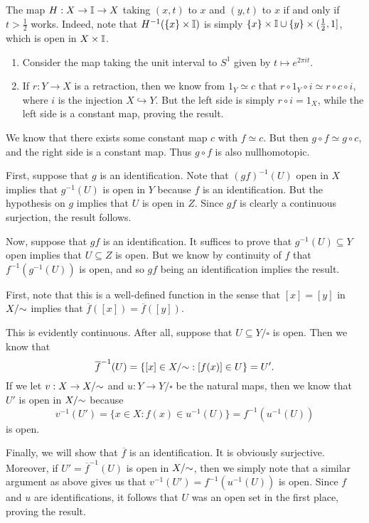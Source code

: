 \documentclass[../solutions.tex]{subfiles}
\begin{document}
\begin{exercise} \leavevmode
The map $H:X\to\mathbb I\to X$ taking $(x,t)$ to $x$ and $(y,t)$ to $x$ if and only if $t>\frac12$ works. Indeed, note that $H^{-1}(\{x\}\times\mathbb I)$ is simply $\{x\}\times\mathbb I\cup\{y\}\times(\frac12,1]$, which is open in $X\times\mathbb I$. 
\end{exercise} 

\begin{exercise} \leavevmode
\begin{enumerate}
\item Consider the map taking the unit interval to $S^1$ given by $t\mapsto e^{2\pi it}$. 

\item If $r:Y\to X$ is a retraction, then we know from $1_Y\simeq c$ that $r\circ1_Y\circ i\simeq r\circ c\circ i$, where $i$ is the injection $X\hookrightarrow Y$. But the left side is simply $r\circ i=1_X$, while the left side is a constant map, proving the result. 
\end{enumerate} 
\end{exercise} 

\begin{exercise} \leavevmode
We know that there exists some constant map $c$ with $f\simeq c$. But then $g\circ f\simeq g\circ c$, and the right side is a constant map. Thus $g\circ f$ is also nullhomotopic. 
\end{exercise} 

\begin{exercise} \leavevmode
First, suppose that $g$ is an identification. Note that $(gf)^{-1}(U)$ open in $X$ implies that $g^{-1}(U)$ is open in $Y$ because $f$ is an identification. But the hypothesis on $g$ implies that $U$ is open in $Z$. Since $gf$ is clearly a continuous surjection, the result follows. 

Now, suppose that $gf$ is an identification. It suffices to prove that $g^{-1}(U)\subseteq Y$ open implies that $U\subseteq Z$ is open. But we know by continuity of $f$ that $f^{-1}(g^{-1}(U))$ is open, and so $gf$ being an identification implies the result. 
\end{exercise} 

\begin{exercise} \leavevmode
First, note that this is a well-defined function in the sense that $[x]=[y]$ in $X/{\sim}$ implies that $\overline f([x])=\overline f([y])$. 

This is evidently continuous. After all, suppose that $U\subseteq Y/\square$ is open. Then we know that \[\overline f^{-1}(U)=\{[x]\in X/{\sim}:[f(x)]\in U\}=U'.\] If we let $v:X\to X/{\sim}$ and $u:Y\to Y/\square$ be the natural maps, then we know that $U'$ is open in $X/{\sim}$ because \[v^{-1}(U')=\{x\in X:f(x)\in u^{-1}(U)\}=f^{-1}(u^{-1}(U))\] is open. 

Finally, we will show that $\overline f$ is an identification. It is obviously surjective. Moreover, if $U'=\overline f^{-1}(U)$ is open in $X/{\sim}$, then we simply note that a similar argument as above gives us that $v^{-1}(U')=f^{-1}(u^{-1}(U))$ is open. Since $f$ and $u$ are identifications, it follows that $U$ was an open set in the first place, proving the result. 
\end{exercise} 
\end{document}

